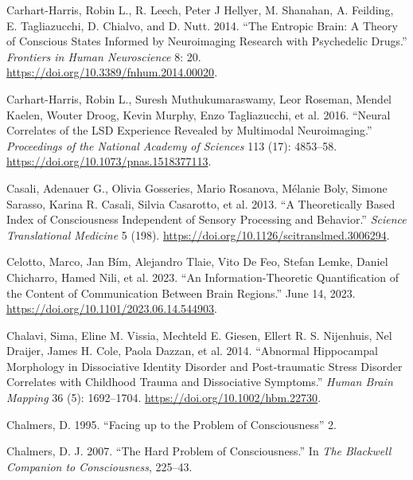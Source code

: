 \documentclass[
  a4paper]{article}
\newlength{\cslhangindent}
\newenvironment{CSLReferences}[2] %
 {\begin{list}{}{%
  \setlength{\itemindent}{0pt}
  \setlength{\leftmargin}{0pt}
  \setlength{\parsep}{0pt}
  \ifodd #1
   \setlength{\leftmargin}{\cslhangindent}
   \setlength{\itemindent}{-1\cslhangindent}
  \fi
  \setlength{\itemsep}{#2\baselineskip}}}
 {\end{list}}
\begin{document}
\begin{CSLReferences}{1}{0}
Carhart-Harris, Robin L., R. Leech, Peter J Hellyer, M. Shanahan, A.
Feilding, E. Tagliazucchi, D. Chialvo, and D. Nutt. 2014. {``The
Entropic Brain: A Theory of Conscious States Informed by Neuroimaging
Research with Psychedelic Drugs.''} \emph{Frontiers in Human
Neuroscience} 8: 20. \url{https://doi.org/10.3389/fnhum.2014.00020}.

Carhart-Harris, Robin L., Suresh Muthukumaraswamy, Leor Roseman, Mendel
Kaelen, Wouter Droog, Kevin Murphy, Enzo Tagliazucchi, et al. 2016.
{``Neural Correlates of the {LSD} Experience Revealed by Multimodal
Neuroimaging.''} \emph{Proceedings of the National Academy of Sciences}
113 (17): 4853--58. \url{https://doi.org/10.1073/pnas.1518377113}.

Casali, Adenauer G., Olivia Gosseries, Mario Rosanova, Mélanie Boly,
Simone Sarasso, Karina R. Casali, Silvia Casarotto, et al. 2013. {``A
Theoretically Based Index of Consciousness Independent of Sensory
Processing and Behavior.''} \emph{Science Translational Medicine} 5
(198). \url{https://doi.org/10.1126/scitranslmed.3006294}.

Celotto, Marco, Jan Bím, Alejandro Tlaie, Vito De Feo, Stefan Lemke,
Daniel Chicharro, Hamed Nili, et al. 2023. {``An Information-Theoretic
Quantification of the Content of Communication Between Brain Regions.''}
June 14, 2023. \url{https://doi.org/10.1101/2023.06.14.544903}.

Chalavi, Sima, Eline M. Vissia, Mechteld E. Giesen, Ellert R. S.
Nijenhuis, Nel Draijer, James H. Cole, Paola Dazzan, et al. 2014.
{``Abnormal Hippocampal Morphology in Dissociative Identity Disorder and
Post‐traumatic Stress Disorder Correlates with Childhood Trauma and
Dissociative Symptoms.''} \emph{Human Brain Mapping} 36 (5): 1692--1704.
\url{https://doi.org/10.1002/hbm.22730}.

Chalmers, D. 1995. {``Facing up to the Problem of Consciousness''} 2.

Chalmers, D. J. 2007. {``The Hard Problem of Consciousness.''} In
\emph{The {Blackwell Companion} to {Consciousness}}, 225--43.


\end{CSLReferences}
\end{document}
